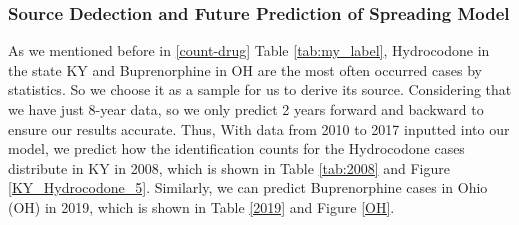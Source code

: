 \documentclass{mcmthesis}
\begin{document}
\subsubsection{Source Dedection and Future Prediction of Spreading Model}
\label{sec: Implementation}

As we mentioned before in \ref{count-drug} Table \ref{tab:my_label}, Hydrocodone in the state KY and Buprenorphine in OH are the most often occurred cases by statistics. So we choose it as a sample for us to derive its source. Considering that we have just 8-year data, so we only predict 2 years forward and backward to ensure our results accurate. Thus, With data from 2010 to 2017 inputted into our model, we predict how the identification counts for the Hydrocodone cases distribute in KY in 2008, which is shown in Table \ref{tab:2008} and Figure \ref{KY_Hydrocodone_5}. Similarly, we can predict Buprenorphine cases in Ohio (OH) in 2019, which is shown in Table \ref{2019} and Figure \ref{OH}.
\end{document}
